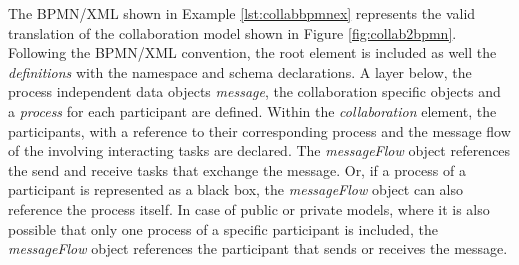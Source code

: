 The BPMN/XML shown in Example \ref{lst:collabbpmnex} represents the valid translation of the collaboration model shown in Figure \ref{fig:collab2bpmn}. Following the BPMN/XML convention, the root element is included as well the \textit{definitions} with the namespace and schema declarations. A layer below, the process independent data objects \textit{message}, the collaboration specific objects and a \textit{process} for each participant are defined. Within the \textit{collaboration} element, the participants, with a reference to their corresponding process and the message flow of the involving interacting tasks are declared. The \textit{messageFlow} object references the send and receive tasks that exchange the message. Or, if a process of a participant is represented as a black box, the \textit{messageFlow} object can also reference the process itself. In case of public or private models, where it is also possible that only one process of a specific participant is included, the \textit{messageFlow} object references the participant that sends or receives the message.


